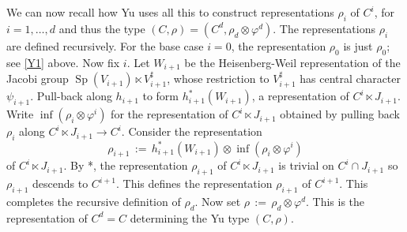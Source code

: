 \documentclass[10pt]{amsart}
\theoremstyle{plain}
\theoremstyle{definition}
\DeclareMathOperator{\trace}{Tr}
\newcommand{\ceq}{{\, :=\, }}
\newcommand{\Sp}{{\operatorname{Sp}}}
\begin{document}
We can now recall how Yu uses all this to construct representations $\rho_i$ of $C^i$, for $i=1, \ldots, d$ and thus the type $(C,\rho) = (C^d,\rho_d\otimes \varphi^d)$.
The representations $\rho_i$ are defined recursively. 
For the base case $i=0$, the representation $\rho_0$ is just $\rho_0$; see \ref{Y1} above.
Now fix $i$.
Let $W_{i+1}$ be the Heisenberg-Weil representation of the Jacobi group $\Sp(V_{i+1})\ltimes V_{i+1}^\sharp$, whose restriction to $V_{i+1}^\sharp$ has central character $\psi_{i+1}$.
Pull-back along $h_{i+1}$ to form $h_{i+1}^*(W_{i+1})$, a representation of $C^i \ltimes J_{i+1}$.
Write $\inf(\rho_i \otimes \varphi^i)$ for the representation of $C^i \ltimes J_{i+1}$ obtained by pulling back $\rho_i$ along $C^i \ltimes J_{i+1} \to C^i$. 
Consider the representation
\begin{equation}\label{eq:tensor}
\rho_{i+1} \ceq h_{i+1}^*(W_{i+1}) \otimes \inf(\rho_i \otimes \varphi^i)
\end{equation}
of $C^i \ltimes J_{i+1}$.
By \cite{yu:01a}*{}, the representation $\rho_{i+1}$ of $C^i \ltimes J_{i+1}$ is trivial on $C^{i}\cap J_{i+1}$ so $\rho_{i+1}$ descends to $C^{i+1}$. 
%
This defines the representation $\rho_{i+1}$ of $C^{i+1}$.
This completes the recursive definition of $\rho_d$. 
Now set $\rho \ceq \rho_d\otimes \varphi^d$. 
This is the representation of $C^d = C$ determining the Yu type $(C,\rho)$.
\end{document}
